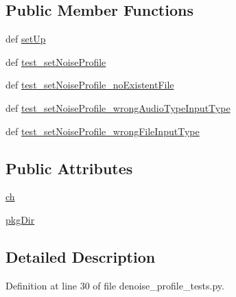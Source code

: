 \subsection*{Public Member Functions}
\begin{DoxyCompactItemize}
\item 
def \hyperlink{classdenoise__profile__tests_1_1DenoiseProfileTests_aded0a425fc2c9012612608d1395fa765}{set\-Up}
\item 
def \hyperlink{classdenoise__profile__tests_1_1DenoiseProfileTests_a486e2e906f2b773d52327880d35c4fb6}{test\-\_\-set\-Noise\-Profile}
\item 
def \hyperlink{classdenoise__profile__tests_1_1DenoiseProfileTests_a67db87650d1c3b8332fc106a3fcd29e6}{test\-\_\-set\-Noise\-Profile\-\_\-no\-Existent\-File}
\item 
def \hyperlink{classdenoise__profile__tests_1_1DenoiseProfileTests_adc7375d0a8b5f89b2abc5b3beaa022d9}{test\-\_\-set\-Noise\-Profile\-\_\-wrong\-Audio\-Type\-Input\-Type}
\item 
def \hyperlink{classdenoise__profile__tests_1_1DenoiseProfileTests_a3376dcd1ec15cf12c4cbb5a31b188023}{test\-\_\-set\-Noise\-Profile\-\_\-wrong\-File\-Input\-Type}
\end{DoxyCompactItemize}
\subsection*{Public Attributes}
\begin{DoxyCompactItemize}
\item 
\hyperlink{classdenoise__profile__tests_1_1DenoiseProfileTests_a42afc2fbd9e3420babd2c4c6e9f10b44}{ch}
\item 
\hyperlink{classdenoise__profile__tests_1_1DenoiseProfileTests_a2b1fb6f5b778b97fee6fec87826f5601}{pkg\-Dir}
\end{DoxyCompactItemize}


\subsection{Detailed Description}


Definition at line 30 of file denoise\-\_\-profile\-\_\-tests.\-py.



